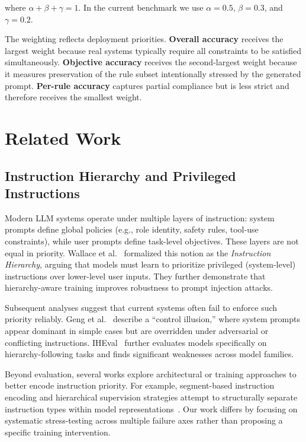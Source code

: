 \documentclass{article}
\begin{document}
where \(\alpha+\beta+\gamma=1\). In the current benchmark we use
\(\alpha=0.5\), \(\beta=0.3\), and \(\gamma=0.2\).

The weighting reflects deployment priorities. 
\textbf{Overall accuracy} receives the largest weight because real systems typically require all constraints to be satisfied simultaneously. 
\textbf{Objective accuracy} receives the second-largest weight because it measures preservation of the rule subset intentionally stressed by the generated prompt. 
\textbf{Per-rule accuracy} captures partial compliance but is less strict and therefore receives the smallest weight.

\section{Related Work}

\subsection{Instruction Hierarchy and Privileged Instructions}

Modern LLM systems operate under multiple layers of instruction: system prompts define global policies (e.g., role identity, safety rules, tool-use constraints), while user prompts define task-level objectives.
These layers are not equal in priority.
Wallace et al.~\cite{wallace2024hierarchy} formalized this notion as the \emph{Instruction Hierarchy}, arguing that models must learn to prioritize privileged (system-level) instructions over lower-level user inputs.
They further demonstrate that hierarchy-aware training improves robustness to prompt injection attacks.

Subsequent analyses suggest that current systems often fail to enforce such priority reliably.
Geng et al.~\cite{geng2025controlillusion} describe a ``control illusion,'' where system prompts appear dominant in simple cases but are overridden under adversarial or conflicting instructions.
IHEval~\cite{zhang2025iheval} further evaluates models specifically on hierarchy-following tasks and finds significant weaknesses across model families.

Beyond evaluation, several works explore architectural or training approaches to better encode instruction priority.
For example, segment-based instruction encoding and hierarchical supervision strategies attempt to structurally separate instruction types within model representations~\cite{wu2024ise}.
Our work differs by focusing on systematic stress-testing across multiple failure axes rather than proposing a specific training intervention.
\end{document}
